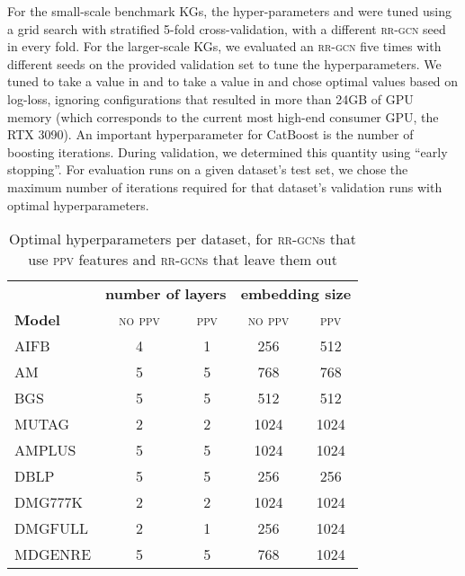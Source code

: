 \documentclass{llncs}
\begin{document}
For the small-scale benchmark KGs, the hyper-parameters  and  were tuned using a grid search with stratified 5-fold cross-validation, with a different \textsc{rr-gcn} seed in every fold. For the larger-scale KGs, we evaluated an \textsc{rr-gcn} five times with different seeds on the provided validation set to tune the hyperparameters. We tuned  to take a value in  and  to take a value in  and chose optimal values based on log-loss, ignoring configurations that resulted in more than 24GB of GPU memory (which corresponds to the current most high-end consumer GPU, the RTX 3090). 
An important hyperparameter for CatBoost is the number of boosting iterations. During validation, we determined this quantity using ``early stopping''. For evaluation runs on a given dataset's test set, we chose the maximum number of iterations required for that dataset's validation runs with optimal hyperparameters. 

\begin{table}[t]
\begin{center}
 
\begin{tabular}{lcccc}
\toprule
{} & \multicolumn{2}{c}{\textbf{number of layers}} & \multicolumn{2}{c}{\textbf{embedding size}} \\\cmidrule(lr){4-5} \cmidrule(lr){2-3}
 \textbf{Model} &      \textsc{no ppv} &  \textsc{ppv}  &         \textsc{no ppv} &     \textsc{ppv} \\
\midrule
AIFB    &      4 &  1 &       256 &   512 \\
AM      &      5 &  5 &       768 &   768 \\
BGS     &      5 &  5 &       512 &   512 \\
MUTAG   &      2 &  2 &      1024 &  1024 \\\midrule
AMPLUS  &      5 &  5 &      1024 &  1024 \\
DBLP    &      5 &  5 &       256 &   256 \\
DMG777K &      2 &  2 &      1024 &  1024 \\
DMGFULL &      2 &  1 &       256 &  1024 \\
MDGENRE &      5 &  5 &       768 &  1024 \\
\bottomrule
\end{tabular}
\end{center}
\caption{Optimal hyperparameters per dataset, for \textsc{rr-gcn}s that use \textsc{ppv} features and \textsc{rr-gcn}s that leave them out \label{table:hyperparams}}
\end{table}
\end{document}
